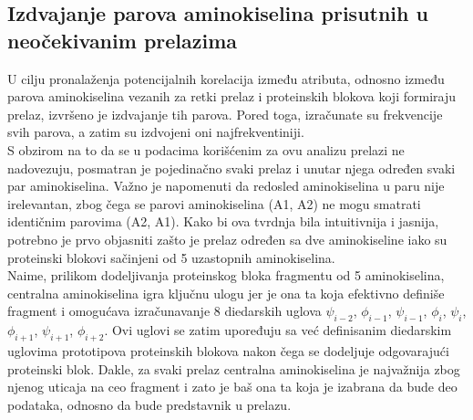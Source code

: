 \documentclass[a4paper,12pt]{article}
\begin{document}
\subsection{Izdvajanje parova aminokiselina prisutnih u neočekivanim prelazima}
U cilju pronalaženja potencijalnih korelacija između atributa, odnosno između parova aminokiselina vezanih za retki prelaz i proteinskih blokova koji formiraju prelaz, izvršeno je izdvajanje tih parova. Pored toga, izračunate su frekvencije svih parova, a zatim su izdvojeni oni najfrekventiniji. \\ 
S obzirom na to da se u podacima korišćenim za ovu analizu prelazi ne nadovezuju, posmatran je pojedinačno svaki prelaz i unutar njega određen svaki par aminokiselina. Važno je napomenuti da redosled aminokiselina u paru nije irelevantan, zbog čega se parovi aminokiselina (A1, A2) ne mogu smatrati identičnim parovima (A2, A1). Kako bi ova tvrdnja bila intuitivnija i jasnija, potrebno je prvo objasniti zašto je prelaz određen sa dve aminokiseline iako su proteinski blokovi sačinjeni od 5 uzastopnih aminokiselina. \\ 
Naime, prilikom dodeljivanja proteinskog bloka fragmentu od 5 aminokiselina, centralna aminokiselina igra ključnu ulogu  jer je ona ta koja efektivno definiše fragment i omogućava izračunavanje 8 diedarskih uglova $\psi_{i-2}$, $\phi_{i-1}$, $\psi_{i-1}$, $\phi_i$, $\psi_i$, $\phi_{i+1}$, $\psi_{i+1}$, $\phi_{i+2}$.  Ovi uglovi se zatim upoređuju sa već definisanim diedarskim uglovima prototipova proteinskih blokova nakon čega se dodeljuje odgovarajući proteinski blok. Dakle, za svaki prelaz centralna aminokiselina je najvažnija zbog njenog uticaja na ceo fragment i zato je baš ona ta koja je izabrana da bude deo podataka, odnosno da bude predstavnik u prelazu. 
\end{document}
